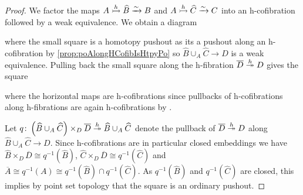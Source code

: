 \begin{prop}
\begin{proof}
        We factor the maps $A\xtailrightarrow{h}\widehat{B}\xrightarrow{\sim} B$ and $A\xtailrightarrow{h}\widehat{C}\xrightarrow{\sim} C$ into an h-cofibration followed by a weak equivalence.
        We obtain a diagram
        \begin{center}
        \end{center}
        where the small square is a homotopy pushout as its a pushout along an h-cofibration by \cref{prop:poAlongHCofibIsHtpyPo} so $\widehat{B}\cup_A\widehat{C}\to D$ is a weak equivalence.
        Pulling back the small square along the h-fibration $\overline{D}\xtwoheadrightarrow{h} D$ gives the square
        \begin{center}
        \end{center}
        where the horizontal maps are h-cofibrations since pullbacks of h-cofibrations along h-fibrations are again h-cofibrations by \cite[Theorem 12]{note_on_cofibs_2}.
        
        Let $q\colon\left(\widehat{B}\cup_A\widehat{C}\right)\times_{D}\overline{D}\xtwoheadrightarrow{h}\widehat{B}\cup_A\widehat{C}$ denote the pullback of $\overline{D}\xtwoheadrightarrow{h} D$ along  $\widehat{B}\cup_A\widehat{C}\to D$.
        Since h-cofibrations are in particular closed embeddings we have $\widehat{B}\times_{D}\overline{D}\cong q^{-1}(\widehat{B})$, $\widehat{C}\times_{D}\overline{D}\cong q^{-1}(\widehat{C})$ and $\overline{A}\cong q^{-1}(A)\cong q^{-1}(\widehat{B})\cap q^{-1}(\widehat{C})$. %
        As $q^{-1}(\widehat{B})$ and $q^{-1}(\widehat{C})$ are closed, this implies by point set topology that the square is an ordinary pushout.


\end{proof}
\end{prop}
